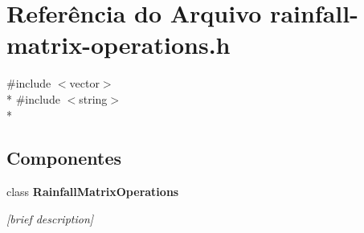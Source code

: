 \section{Referência do Arquivo rainfall-\/matrix-\/operations.h}
\label{rainfall-matrix-operations_8h}
{\ttfamily \#include $<$vector$>$}\\*
{\ttfamily \#include $<$string$>$}\\*
\subsection*{Componentes}
\begin{DoxyCompactItemize}
\item 
class {\bf Rainfall\+Matrix\+Operations}
\begin{DoxyCompactList}\small\item\em [brief description] \end{DoxyCompactList}\end{DoxyCompactItemize}
